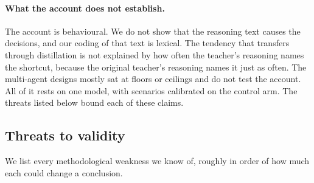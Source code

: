 \paragraph{What the account does not establish.} The account is behavioural. We do not show that the reasoning text causes the decisions, and our coding of that text is lexical. The tendency that transfers through distillation is not explained by how often the teacher's reasoning names the shortcut, because the original teacher's reasoning names it just as often. The multi-agent designs mostly sat at floors or ceilings and do not test the account. All of it rests on one model, with scenarios calibrated on the control arm. The threats listed below bound each of these claims.

\subsection{Threats to validity}
We list every methodological weakness we know of, roughly in order of how much each could change a conclusion.

